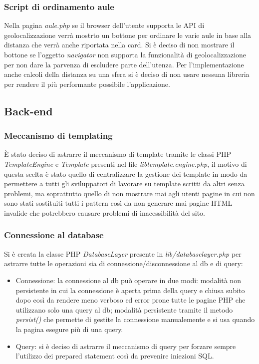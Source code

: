 \subsubsection{Script di ordinamento aule}
Nella pagina \textit{aule.php} se il browser dell'utente supporta le API di geolocalizzazione verrà mostrto un bottone per ordinare le varie aule in base alla distanza che verrà anche riportata nella card. Si è deciso di non mostrare il bottone se l'oggetto \textit{navigator} non supporta la funzionalità di geolocalizzazione per non dare la parvenza di escludere parte dell'utenza. Per l'implementazione anche calcoli della distanza su una sfera si è deciso di
non usare nessuna libreria per rendere il più performante possibile l'applicazione.

\subsection{Back-end}

\subsubsection{Meccanismo di templating}
È stato deciso di astrarre il meccanismo di template tramite le classi PHP
\textit{TemplateEngine} e \textit{Template} presenti nel file 
\textit{lib\slshape template.engine.php}, il motivo di questa scelta è stato
quello di centralizzare la gestione dei template in modo da permettere a tutti
gli sviluppatori di lavorare su template scritti da altri senza problemi, ma
soprattutto quello di non mostrare mai agli utenti pagine in cui non sono stati
sostituiti tutti i pattern così da non generare mai pagine HTML invalide che
potrebbero causare problemi di inacessibilità del sito.

\subsubsection{Connessione al database}
Si è creata la classe PHP \textit{DatabaseLayer} presente in
\textit{lib/databaselayer.php} per astrarre tutte le operazioni sia di
connessione/disconnessione al db e di query:
\begin{itemize}
    \item Connessione: la connessione al db può operare in due modi: modalità
        non persistente in cui la connessione è aperta prima della query e
        chiusa subito dopo così da rendere meno verboso ed error prone tutte le
        pagine PHP che utilizzano solo una query al db; modalità persistente
        tramite il metodo \textit{persist()} che permette di gestite la
        connessione manualemente e si usa quando la pagina esegure più di una
        query.
    \item Query: si è deciso di astrarre il meccanismo di query per forzare
        sempre l'utilizzo dei prepared statement così da prevenire iniezioni
        SQL.
\end{itemize}

